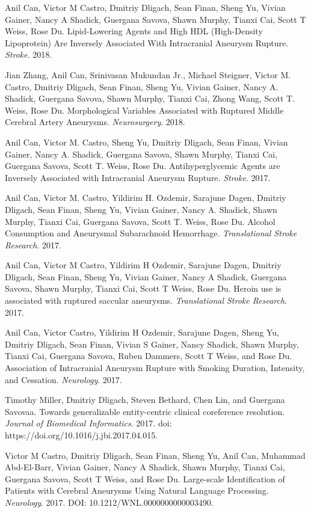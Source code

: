 \documentclass[letterpaper]{article}
\renewenvironment{itemize}{
  \begin{list}{}{
    \setlength{\leftmargin}{1.5em}
  }
}{
  \end{list}
}
\begin{document}
\begin{itemize}
\item Anil Can, Victor M Castro, Dmitriy Dligach, Sean Finan, Sheng Yu, Vivian Gainer, Nancy A Shadick, Guergana Savova, Shawn Murphy, Tianxi Cai, Scott T Weiss, Rose Du. Lipid-Lowering Agents and High HDL (High-Density Lipoprotein) Are Inversely Associated With Intracranial Aneurysm Rupture. \emph{Stroke}. 2018.
\item Jian Zhang, Anil Can, Srinivasan Mukundan Jr., Michael Steigner, Victor M. Castro, Dmitriy Dligach, Sean Finan, Sheng Yu, Vivian Gainer, Nancy A. Shadick, Guergana Savova, Shawn Murphy, Tianxi Cai, Zhong Wang, Scott T. Weiss, Rose Du. Morphological Variables Associated with Ruptured Middle Cerebral Artery Aneurysms. \emph{Neurosurgery}. 2018.
\item Anil Can, Victor M. Castro, Sheng Yu, Dmitriy Dligach, Sean Finan, Vivian Gainer, Nancy A. Shadick, Guergana Savova, Shawn Murphy, Tianxi Cai, Guergana Savova, Scott T. Weiss, Rose Du. Antihyperglycemic Agents are Inversely Associated with Intracranial Aneurysm Rupture. \emph{Stroke}. 2017.
\item Anil Can, Victor M. Castro, Yildirim H. Ozdemir, Sarajune Dagen, Dmitriy Dligach, Sean Finan, Sheng Yu, Vivian Gainer, Nancy A. Shadick, Shawn Murphy, Tianxi Cai, Guergana Savova, Scott T. Weiss, Rose Du. Alcohol Consumption and Aneurysmal Subarachnoid Hemorrhage. \emph{Translational Stroke Research}. 2017.
\item Anil Can, Victor M Castro, Yildirim H Ozdemir, Sarajune Dagen, Dmitriy Dligach, Sean Finan, Sheng Yu, Vivian Gainer, Nancy A Shadick, Guergana Savova, Shawn Murphy, Tianxi Cai, Scott T Weiss, Rose Du. Heroin use is associated with ruptured saccular aneurysms. \emph{Translational Stroke Research}. 2017.
\item Anil Can, Victor Castro, Yildirim H Ozdemir, Sarajune Dagen, Sheng Yu, Dmitriy Dligach, Sean Finan, Vivian S Gainer, Nancy Shadick, Shawn Murphy, Tianxi Cai, Guergana Savova, Ruben Dammers, Scott T Weiss, and Rose Du. Association of Intracranial Aneurysm Rupture with Smoking Duration, Intensity, and Cessation. \emph{Neurology}. 2017.
\item Timothy Miller, Dmitriy Dligach, Steven Bethard, Chen Lin, and Guergana Savovaa. Towards generalizable entity-centric clinical coreference resolution. \emph{Journal of Biomedical Informatics}. 2017. doi: https://doi.org/10.1016/j.jbi.2017.04.015.
\item Victor M Castro, Dmitriy Dligach, Sean Finan, Sheng Yu, Anil Can, Muhammad Abd-El-Barr, Vivian Gainer, Nancy A Shadick, Shawn Murphy, Tianxi Cai, Guergana Savova, Scott T Weiss, and Rose Du. Large-scale Identification of Patients with Cerebral Aneurysms Using Natural Language Processing. \emph{Neurology}. 2017. DOI: 10.1212/WNL.0000000000003490.

\end{itemize}
\end{document}
